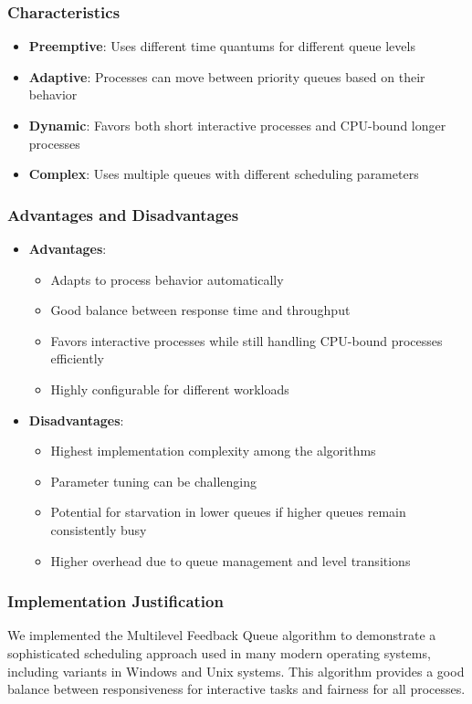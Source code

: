 \documentclass[12pt,a4paper]{article}
\begin{document}
\subsubsection{Characteristics}
\begin{itemize}
    \item \textbf{Preemptive}: Uses different time quantums for different queue levels
    \item \textbf{Adaptive}: Processes can move between priority queues based on their behavior
    \item \textbf{Dynamic}: Favors both short interactive processes and CPU-bound longer processes
    \item \textbf{Complex}: Uses multiple queues with different scheduling parameters
\end{itemize}

\subsubsection{Advantages and Disadvantages}
\begin{itemize}
    \item \textbf{Advantages}:
    \begin{itemize}
        \item Adapts to process behavior automatically
        \item Good balance between response time and throughput
        \item Favors interactive processes while still handling CPU-bound processes efficiently
        \item Highly configurable for different workloads
    \end{itemize}
    \item \textbf{Disadvantages}:
    \begin{itemize}
        \item Highest implementation complexity among the algorithms
        \item Parameter tuning can be challenging
        \item Potential for starvation in lower queues if higher queues remain consistently busy
        \item Higher overhead due to queue management and level transitions
    \end{itemize}
\end{itemize}

\subsubsection{Implementation Justification}
We implemented the Multilevel Feedback Queue algorithm to demonstrate a sophisticated scheduling approach used in many modern operating systems, including variants in Windows and Unix systems. This algorithm provides a good balance between responsiveness for interactive tasks and fairness for all processes.
\end{document}
